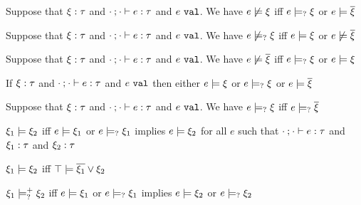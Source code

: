 \begin{lem}
  \label{lem:neg-satisfaction}
  Suppose that $\xi : \tau$ and $\cdot \mathbin{;} \cdot \vdash e : \tau$ and $e ~\mathtt{val}$. We have $e \not\models \xi$ iff $e \models_{?} \xi$ or $e \models \overline{\xi}$
\end{lem}
\begin{lem}
  \label{lem:neg-possible-satisfaction}
  Suppose that $\xi : \tau$ and $\cdot \mathbin{;} \cdot \vdash e : \tau$ and $e ~\mathtt{val}$. We have $e \not\models_{?} \xi$ iff $e \models \xi$ or $e \not\models \overline{\xi}$
\end{lem}
\begin{lem}
  \label{lem:neg-dual-satisfaction}
  Suppose that $\xi : \tau$ and $\cdot \mathbin{;} \cdot \vdash e : \tau$ and $e ~\mathtt{val}$. We have $e \not\models \overline{\xi}$ iff $e \models_{?} \xi$ or $e \models \xi$
\end{lem}
\begin{lem}
  \label{lem:coverage-constraint-satisfaction}
  If $\xi : \tau$ and $\cdot \mathbin{;} \cdot \vdash e : \tau$ and $e ~\mathtt{val}$ then either $e \models \xi$ or $e \models_{?} \xi$ or $e \models \overline{\xi}$
\end{lem}

\begin{corol}
  \label{corol:possible-satisfaction-dual}
  Suppose that $\xi : \tau$ and $\cdot \mathbin{;} \cdot \vdash e : \tau$ and $e ~\mathtt{val}$. We have $e \models_{?} \xi$ iff $e \models_{?} \overline{\xi}$
\end{corol}

\begin{defn}
  \label{defn:const-entailment}
  $\xi_1 \models \xi_2$ iff $e \models \xi_1$ or $e \models_{?} \xi_1$ implies $e \models \xi_2$ for all $e$ such that $\cdot \mathbin{;} \cdot \vdash e : \tau$ and $\xi_1 : \tau$ and $\xi_2 : \tau$
\end{defn}
\begin{corol}
  \label{lemma:material-entailment}
  $\xi_1 \models \xi_2$ iff $\top \models \overline{\xi_1} \vee \xi_2$
\end{corol}

\begin{defn}
  \label{defn:undeter-material-entailment}
  $\xi_1 \models_{?}^{+} \xi_2$ iff $e \models \xi_1$ or $e \models_{?} \xi_1$ implies $e \models \xi_2$ or $e \models_{?} \xi_2$
  
\end{defn}


